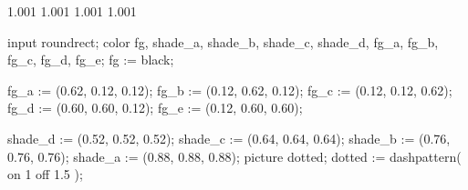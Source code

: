     {1.001}
 {1.001}
   {1.001}
      {1.001}

\let\center\raggedcenter

%
%

\startMPinclusions[+]
input roundrect;
color fg, shade_a, shade_b, shade_c, shade_d, fg_a, fg_b, fg_c, fg_d, fg_e;
fg := black;

fg_a := (0.62, 0.12, 0.12);
fg_b := (0.12, 0.62, 0.12);
fg_c := (0.12, 0.12, 0.62);
fg_d := (0.60, 0.60, 0.12);
fg_e := (0.12, 0.60, 0.60);

shade_d := (0.52, 0.52, 0.52);
shade_c := (0.64, 0.64, 0.64);
shade_b := (0.76, 0.76, 0.76);
shade_a := (0.88, 0.88, 0.88);
picture dotted;
dotted := dashpattern( on 1 off 1.5 );
\stopMPinclusions
